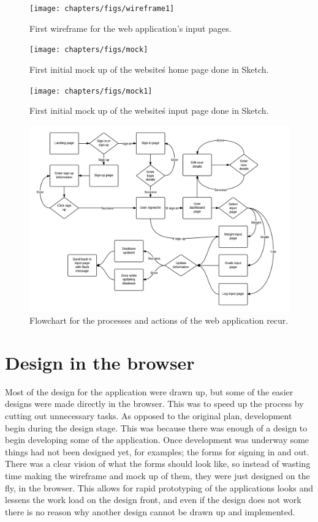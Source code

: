 \begin{figure}[!ht]
\centering
\texttt{[image: chapters/figs/wireframe1]}
\caption{First wireframe for the web application's input pages.}
\label{fig:erd}
\end{figure}

\begin{figure}[!ht]
\centering
\texttt{[image: chapters/figs/mock]}
\caption{First initial mock up of the website\'s home page done in Sketch.}
\label{fig:erd}
\end{figure}

\begin{figure}[!ht]
\centering
\texttt{[image: chapters/figs/mock1]}
\caption{First initial mock up of the website\'s input page done in Sketch.}
\label{fig:erd}
\end{figure}

\begin{figure}[!ht]
\centering
\includegraphics[scale=0.3]{chapters/figs/flowchart}
\caption{Flowchart for the processes and actions of the web application recur.}
\label{fig:flowchart}
\end{figure}

\section{Design in the browser}
Most of the design for the application were drawn up, but some of the easier designs were made directly in the browser. This was to speed up the process by cutting out unnecessary tasks. As opposed to the original plan, development begin during the design stage. This was because there was enough of a design to begin developing some of the application. Once development was underway some things had not been designed yet, for examples; the forms for signing in and out. There was a clear vision of what the forms should look like, so instead of wasting time making the wireframe and mock up of them, they were just designed on the fly, in the browser. This allows for rapid prototyping of the applications looks and lessens the work load on the design front, and even if the design does not work there is no reason why another design cannot be drawn up and implemented.\\

